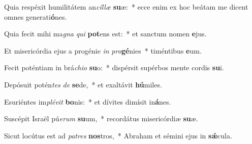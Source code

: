 \item Quia respéxit humilitátem an\textit{cíl}\textit{læ} \textbf{su}æ:~* ecce enim ex hoc beátam me dicent omnes generati\textbf{ó}nes.
\item Quia fecit mihi ma\textit{gna} \textit{qui} \textbf{pot}ens est:~* et sanctum nomen \textbf{e}jus.
\item Et misericórdia ejus a progénie \textit{in} \textit{pro}\textbf{gé}nies~* timéntibus \textbf{e}um.
\item Fecit poténtiam in brá\textit{chi}\textit{o} \textbf{su}o:~* dispérsit supérbos mente cordis \textbf{su}i.
\item Depósuit potén\textit{tes} \textit{de} \textbf{se}de,~* et exaltávit \textbf{hú}miles.
\item Esuriéntes im\textit{plé}\textit{vit} \textbf{bo}nis:~* et dívites dimísit in\textbf{á}nes.
\item Suscépit Israël pú\textit{e}\textit{rum} \textbf{su}um,~* recordátus misericórdiæ \textbf{su}æ.
\item Sicut locútus est ad \textit{pa}\textit{tres} \textbf{nos}tros,~* Abraham et sémini ejus in \textbf{sǽ}cula.
